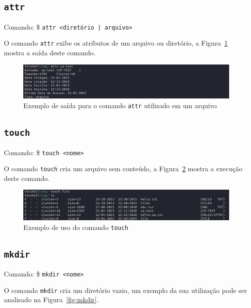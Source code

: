 \documentclass[
    12pt,				%
    oneside,   	        %
    a4paper,			%
    english,			%
    french,				%
    spanish,			%
    brazil,				%
    ]{pacotes/abntex2}
\begin{document}

\subsection{\texttt{attr}}
\label{subsec:attr}
Comando: \$ \texttt{attr <diretório | arquivo> }

O comando \texttt{attr} exibe os atributos de um arquivo ou diretório, a Figura~\ref{fig:attr} mostra a saída deste comando.

\begin{figure}[H]
    \centering
    \includegraphics[width=450pt]{figuras/resultados/4-attr.PNG}
    \caption{Exemplo de saída para o comando \texttt{attr} utilizado em um arquivo}
    \label{fig:attr}
\end{figure}


\subsection{\texttt{touch}}
\label{subsec:touch}
Comando: \$ \texttt{touch <nome>} 

O comando \texttt{touch} cria um arquivo sem conteúdo, a Figura~\ref{fig:touch} mostra a execução deste comando.

\begin{figure}[h!]
    \centering
    \includegraphics[width=450pt]{figuras/resultados/8-touch.PNG}
    \caption{Exemplo de uso do comando \texttt{touch}}
    \label{fig:touch}
\end{figure}


\subsection{\texttt{mkdir}}
\label{subsec:mkdir}
Comando: \$ \texttt{mkdir <nome>}

O comando \texttt{mkdir} cria um diretório vazio, um exemplo da sua utilização pode ser analisado na Figura~\ref{fig:mkdir}.
\end{document}
